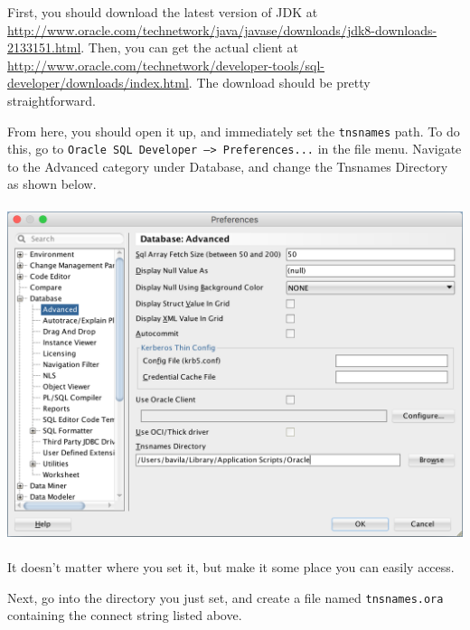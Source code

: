 \documentclass[11pt]{article} %
\begin{document}
First, you should download the latest version of JDK at \url{http://www.oracle.com/technetwork/java/javase/downloads/jdk8-downloads-2133151.html}. Then, you can get the actual client at \url{http://www.oracle.com/technetwork/developer-tools/sql-developer/downloads/index.html}. The download should be pretty straightforward.

From here, you should open it up, and immediately set the \texttt{tnsnames} path. To do this, go to \texttt{Oracle SQL Developer --> Preferences...} in the file menu. Navigate to the Advanced category under Database, and change the Tnsnames Directory as shown below.
\\
\\
\includegraphics[scale=0.5]{TNS Preferences.png}
\\
\\
It doesn't matter where you set it, but make it some place you can easily access.

Next, go into the directory you just set, and create a file named \texttt{tnsnames.ora} containing the connect string listed above.
\end{document}
